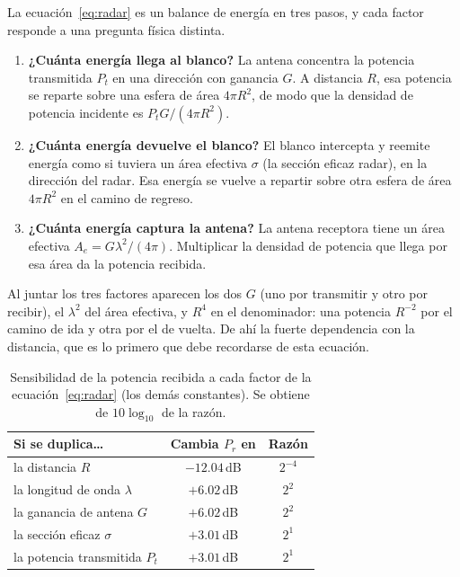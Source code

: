 \documentclass[11pt,a4paper]{article}
\begin{document}
La ecuación~\eqref{eq:radar} es un balance de energía en tres pasos, y cada factor responde a una pregunta
física distinta.

\begin{enumerate}
  \item \textbf{¿Cuánta energía llega al blanco?} La antena concentra la potencia transmitida $P_t$ en una
        dirección con ganancia $G$. A distancia $R$, esa potencia se reparte sobre una esfera de área
        $4\pi R^2$, de modo que la densidad de potencia incidente es $P_tG/(4\pi R^2)$.
  \item \textbf{¿Cuánta energía devuelve el blanco?} El blanco intercepta y reemite energía como si
        tuviera un área efectiva $\sigma$ (la sección eficaz radar), en la dirección del radar. Esa energía se
        vuelve a repartir sobre otra esfera de área $4\pi R^2$ en el camino de regreso.
  \item \textbf{¿Cuánta energía captura la antena?} La antena receptora tiene un área efectiva
        $A_e = G\lambda^2/(4\pi)$. Multiplicar la densidad de potencia que llega por esa área da la potencia
        recibida.
\end{enumerate}
Al juntar los tres factores aparecen los dos $G$ (uno por transmitir y otro por recibir), el $\lambda^2$ del área
efectiva, y $R^4$ en el denominador: una potencia $R^{-2}$ por el camino de ida y otra por el de vuelta. De
ahí la fuerte dependencia con la distancia, que es lo primero que debe recordarse de esta ecuación.

\begin{table}[htbp]
\centering\small
\begin{tabular}{lcc}
\toprule
Si se duplica\ldots & Cambia $P_r$ en & Razón\\\midrule
la distancia $R$ & $-12.04$\,dB & $2^{-4}$\\
la longitud de onda $\lambda$ & $+6.02$\,dB & $2^{2}$\\
la ganancia de antena $G$ & $+6.02$\,dB & $2^{2}$\\
la sección eficaz $\sigma$ & $+3.01$\,dB & $2^{1}$\\
la potencia transmitida $P_t$ & $+3.01$\,dB & $2^{1}$\\\bottomrule
\end{tabular}
\caption{Sensibilidad de la potencia recibida a cada factor de la ecuación~\eqref{eq:radar} (los demás
constantes). Se obtiene de $10\log_{10}$ de la razón.}
\label{tab:sensibilidad-radar}
\end{table}
\end{document}
